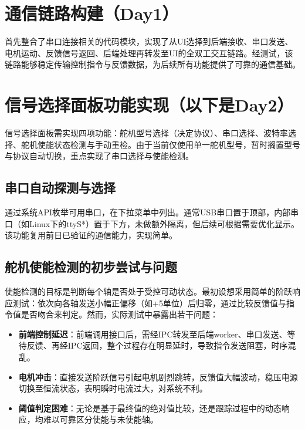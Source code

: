 \documentclass{ctexart}
\begin{document}
\pagestyle{plain}

\tableofcontents

\clearpage
{}

\section{通信链路构建（Day1）}

首先整合了串口连接相关的代码模块，实现了从UI选择到后端接收、串口发送、电机运动、反馈信号返回、后端处理再转发至UI的全双工交互链路。经测试，该链路能够稳定传输控制指令与反馈数据，为后续所有功能提供了可靠的通信基础。

\section{信号选择面板功能实现（以下是Day2）}

信号选择面板需实现四项功能：舵机型号选择（决定协议）、串口选择、波特率选择、舵机使能状态检测与手动重检。由于当前仅使用单一舵机型号，暂时搁置型号与协议自动切换，重点实现了串口选择与使能检测。

\subsection{串口自动探测与选择}

通过系统API枚举可用串口，在下拉菜单中列出。通常USB串口置于顶部，内部串口（如Linux下的ttyS*）置于下方，未做额外隔离，但后续可根据需要优化显示。该功能复用前日已验证的通信能力，实现简单。

\subsection{舵机使能检测的初步尝试与问题}

使能检测的目标是判断每个轴是否处于受控可动状态。最初设想采用简单的阶跃响应测试：依次向各轴发送小幅正偏移（如+5单位）后归零，通过比较反馈值与指令值是否吻合来判定。然而，实际测试中暴露出若干问题：

\begin{itemize}[leftmargin=2.5em]
  \item \textbf{前端控制延迟}：前端调用接口后，需经IPC转发至后端worker、串口发送、等待反馈、再经IPC返回，整个过程存在明显延时，导致指令发送阻塞，时序混乱。
  \item \textbf{电机冲击}：直接发送阶跃信号引起电机剧烈跳转，反馈值大幅波动，稳压电源切换至恒流状态，表明瞬时电流过大，对系统不利。
  \item \textbf{阈值判定困难}：无论是基于最终值的绝对值比较，还是跟踪过程中的动态响应，均难以可靠区分使能与未使能轴。
\end{itemize}
\end{document}
